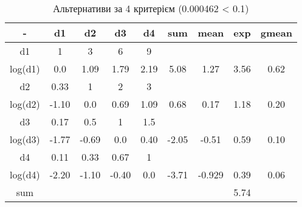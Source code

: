\begin{table}[!ht]
    \centering
    \caption{Альтернативи за 4 критерієм (0.000462 < 0.1)}
    \label{tab:alternative_priorities4}

    \begin{tabular}{|c||c|c|c|c||c|c|c||c|}
        \toprule
        -       & d1    & d2    & d3    & d4   & sum   & mean   & exp  & gmean \\

        \midrule
        d1      & 1     & 3     & 6     & 9    &       &        &      &       \\
        log(d1) & 0.0   & 1.09  & 1.79  & 2.19 & 5.08  & 1.27   & 3.56 & 0.62  \\
        \hline
        d2      & 0.33  & 1     & 2     & 3    &       &        &      &       \\
        log(d2) & -1.10 & 0.0   & 0.69  & 1.09 & 0.68  & 0.17   & 1.18 & 0.20  \\
        \hline
        d3      & 0.17  & 0.5   & 1     & 1.5  &       &        &      &       \\
        log(d3) & -1.77 & -0.69 & 0.0   & 0.40 & -2.05 & -0.51  & 0.59 & 0.10  \\
        \hline
        d4      & 0.11  & 0.33  & 0.67  & 1    &       &        &      &       \\
        log(d4) & -2.20 & -1.10 & -0.40 & 0.0  & -3.71 & -0.929 & 0.39 & 0.06  \\

        \bottomrule
        sum     &       &       &       &      &       &        & 5.74 &       \\
        \hline
    \end{tabular}
\end{table}

